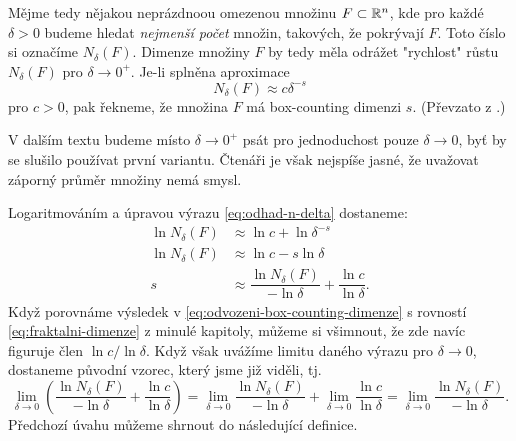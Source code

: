 Mějme tedy nějakou neprázdnoou omezenou množinu $F\subset\mathbb{R}^n$, kde pro každé $\delta>0$ budeme hledat \emph{nejmenší počet} množin, takových, že pokrývají $F$. Toto číslo si označíme $N_\delta(F)$. Dimenze množiny $F$ by tedy měla odrážet "rychlost" růstu $N_\delta(F)$ pro $\delta\to 0^+$. Je-li splněna aproximace
\begin{equation}\label{eq:odhad-n-delta}
    N_\delta(F)\approx c\delta^{-s}
\end{equation}
pro $c>0$, pak řekneme, že množina $F$ má box-counting dimenzi $s$. (Převzato z \citep[str. 27]{Falconer2014}.)
\begin{remark}
    V dalším textu budeme místo $\delta\to 0^+$ psát pro jednoduchost pouze $\delta\to 0$, byť by se slušilo používat první variantu. Čtenáři je však nejspíše jasné, že uvažovat záporný průměr množiny nemá smysl.
\end{remark}
Logaritmováním a úpravou výrazu \eqref{eq:odhad-n-delta} dostaneme:
\begin{align}\label{eq:odvozeni-box-counting-dimenze}
    \ln{N_\delta(F)}&\approx\ln{c}+\ln{\delta^{-s}}\\
    \ln{N_\delta(F)}&\approx\ln{c}-s\ln{\delta}\\
    s&\approx\dfrac{\ln{N_\delta(F)}}{-\ln{\delta}}+\dfrac{\ln{c}}{\ln{\delta}}.
\end{align}
Když porovnáme výsledek v \eqref{eq:odvozeni-box-counting-dimenze} s rovností \eqref{eq:fraktalni-dimenze} z minulé kapitoly, můžeme si všimnout, že zde navíc figuruje člen $\ln{c}/\ln{\delta}$. Když však uvážíme limitu daného výrazu pro $\delta\to 0$, dostaneme původní vzorec, který jsme již viděli, tj.
\[\lim_{\delta\to 0}\left(\dfrac{\ln{N_\delta(F)}}{-\ln{\delta}}+\dfrac{\ln{c}}{\ln{\delta}}\right)=\lim_{\delta\to 0}\dfrac{\ln{N_\delta(F)}}{-\ln{\delta}}+\lim_{\delta\to 0}\dfrac{\ln{c}}{\ln{\delta}}=\lim_{\delta\to 0}\dfrac{\ln{N_\delta(F)}}{-\ln{\delta}}.\]
Předchozí úvahu můžeme shrnout do následující definice.
